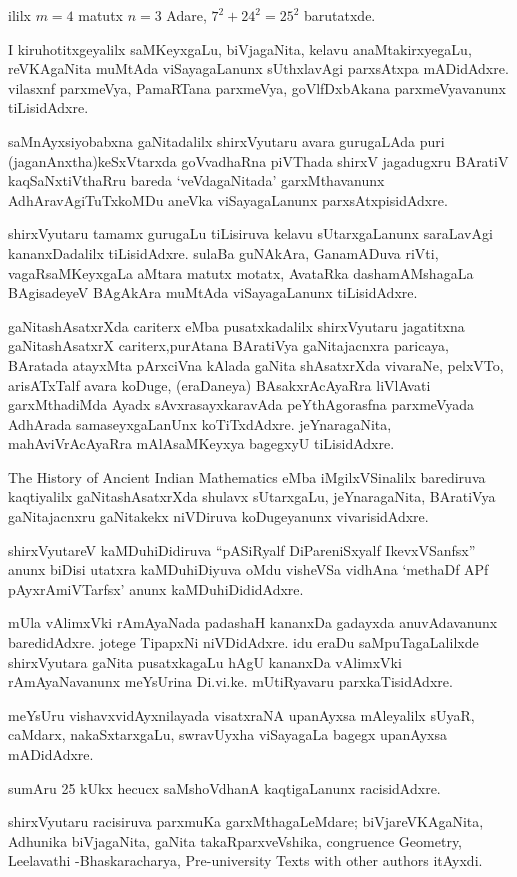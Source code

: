 ililx $m=4$ matutx $n=3$ Adare, $7^2+24^{2}=25^2$ barutatxde.

I kiruhotitxgeyalilx saMKeyxgaLu, biVjagaNita, kelavu anaMtakirxyegaLu, reVKA\-gaNita muMtAda viSayagaLanunx sUthxlavAgi parxsAtxpa mADidAdxre. vilasxnf parxmeVya, PamaRTana parxmeVya, goVlfDxbAkana parxmeVyavanunx tiLisidAdxre.

saMnAyxsiyobabxna gaNitadalilx shirxVyutaru avara gurugaLAda puri (jaganAnxtha)\break keSxVtarxda goVvadhaRna piVThada shirxV jagadugxru BAratiV kaqSaNxtiVthaRru bareda `veVdagaNitada' garxMthavanunx AdhAravAgiTuTxkoMDu aneVka viSayagaLanunx parxsAtxpisidAdxre.

shirxVyutaru tamamx gurugaLu tiLisiruva kelavu sUtarxgaLanunx saraLavAgi kananxDadalilx tiLisidAdxre. sulaBa guNAkAra, GanamADuva riVti, vagaRsaMKeyxgaLa aMtara matutx motatx, AvataRka dashamAMshagaLa BAgisadeyeV BAgAkAra muMtAda viSayagaLanunx tiLisidAdxre.

gaNitashAsatxrXda cariterx eMba pusatxkadalilx shirxVyutaru jagatitxna gaNitashAsatxrX cariterx,\break purAtana BAratiVya gaNitajacnxra paricaya, BAratada atayxMta pArxciVna kAlada gaNita shAsatxrXda vivaraNe, pelxVTo, arisATxTalf avara koDuge, (eraDaneya) BAsakxrAcAyaRra liVlAvati garxMthadiMda Ayadx sAvxrasayxkaravAda peYthAgorasfna parxmeVyada AdhArada samaseyxgaLanUnx koTiTxdAdxre. jeYnaragaNita, mahAviVrAcAyaRra mAlAsaMKeyxya bagegxyU tiLisidAdxre.

{\rm The History of Ancient Indian Mathematics} eMba iMgilxVSinalilx barediruva kaqtiyalilx gaNitashAsatxrXda shulavx sUtarxgaLu, jeYnaragaNita, BAratiVya gaNitajacnxru gaNitakekx niVDiruva koDugeyanunx vivarisidAdxre.

shirxVyutareV kaMDuhiDidiruva ``pASiRyalf DiPareniSxyalf IkevxVSanfsx'' anunx biDisi utatxra kaMDuhiDiyuva oMdu visheVSa vidhAna `methaDf APf pAyxrAmiVTarfsx' anunx kaMDuhiDididAdxre.

mUla vAlimxVki rAmAyaNada padashaH kananxDa gadayxda anuvAdavanunx baredidAdxre. jotege TipapxNi niVDidAdxre. idu eraDu saMpuTagaLalilxde shirxVyutara gaNita pusatxka\-gaLu hAgU kananxDa vAlimxVki rAmAyaNavanunx meYsUrina Di.vi.ke. mUtiRyavaru parxkaTisidAdxre.

meYsUru vishavxvidAyxnilayada visatxraNA upanAyxsa mAleyalilx sUyaR, caMdarx, nakaSxtarxgaLu, swravUyxha viSayagaLa bagegx upanAyxsa mADidAdxre.

sumAru {\rm 25} kUkx hecucx saMshoVdhanA kaqtigaLanunx racisidAdxre.

shirxVyutaru racisiruva parxmuKa garxMthagaLeMdare; biVjareVKAgaNita, Adhunika biVja\-gaNita, gaNita takaRparxveVshika, {\rm congruence Geometry, Leelavathi -\break Bhaskaracharya, Pre-university Texts with other authors} itAyxdi.


